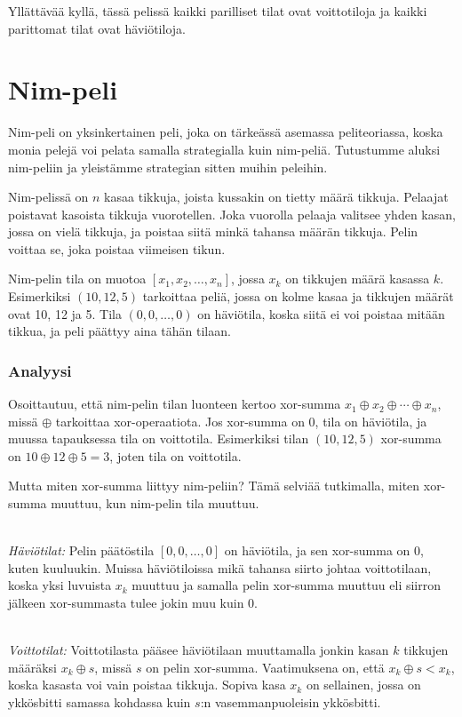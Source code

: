 Yllättävää kyllä, tässä pelissä kaikki
parilliset tilat ovat voittotiloja ja
kaikki parittomat tilat ovat häviötiloja.

\section{Nim-peli}


Nim-peli on yksinkertainen peli,
joka on tärkeässä asemassa peliteoriassa,
koska monia pelejä voi pelata samalla
strategialla kuin nim-peliä.
Tutustumme aluksi nim-peliin ja yleistämme
strategian sitten muihin peleihin.

Nim-pelissä on $n$ kasaa tikkuja,
joista kussakin on tietty määrä tikkuja.
Pelaajat poistavat kasoista tikkuja vuorotellen.
Joka vuorolla pelaaja valitsee yhden kasan,
jossa on vielä tikkuja,
ja poistaa siitä minkä tahansa määrän tikkuja.
Pelin voittaa se, joka poistaa viimeisen tikun.

Nim-pelin tila on muotoa $[x_1,x_2,\ldots,x_n]$,
jossa $x_k$ on tikkujen määrä kasassa $k$.
Esimerkiksi $(10,12,5)$ tarkoittaa peliä,
jossa on kolme kasaa ja tikkujen määrät ovat 10, 12 ja 5.
Tila $(0,0,\ldots,0)$ on häviötila,
koska siitä ei voi poistaa mitään tikkua,
ja peli päättyy aina tähän tilaan.

\subsubsection{Analyysi}

Osoittautuu, että nim-pelin tilan luonteen
kertoo xor-summa $x_1 \oplus x_2 \oplus \cdots \oplus x_n$,
missä $\oplus$ tarkoittaa xor-operaatiota.
Jos xor-summa on 0, tila on häviötila,
ja muussa tapauksessa tila on voittotila.
Esimerkiksi tilan $(10,12,5)$ xor-summa on
$10 \oplus 12 \oplus 5 = 3$, joten tila on voittotila.

Mutta miten xor-summa liittyy nim-peliin?
Tämä selviää tutkimalla, miten xor-summa muuttuu,
kun nim-pelin tila muuttuu.

~\\
\noindent
\textit{Häviötilat:}
Pelin päätöstila $[0,0,\ldots,0]$ on häviötila,
ja sen xor-summa on 0, kuten kuuluukin.
Muissa häviötiloissa mikä tahansa siirto johtaa
voittotilaan, koska yksi luvuista $x_k$ muuttuu
ja samalla pelin xor-summa muuttuu
eli siirron jälkeen xor-summasta tulee jokin muu kuin 0.

~\\
\noindent
\textit{Voittotilat:}
Voittotilasta pääsee häviötilaan muuttamalla
jonkin kasan $k$ tikkujen määräksi $x_k \oplus s$,
missä $s$ on pelin xor-summa.
Vaatimuksena on, että $x_k \oplus s < x_k$,
koska kasasta voi vain poistaa tikkuja.
Sopiva kasa $x_k$ on sellainen,
jossa on ykkösbitti samassa kohdassa kuin
$s$:n vasemmanpuoleisin ykkösbitti.


